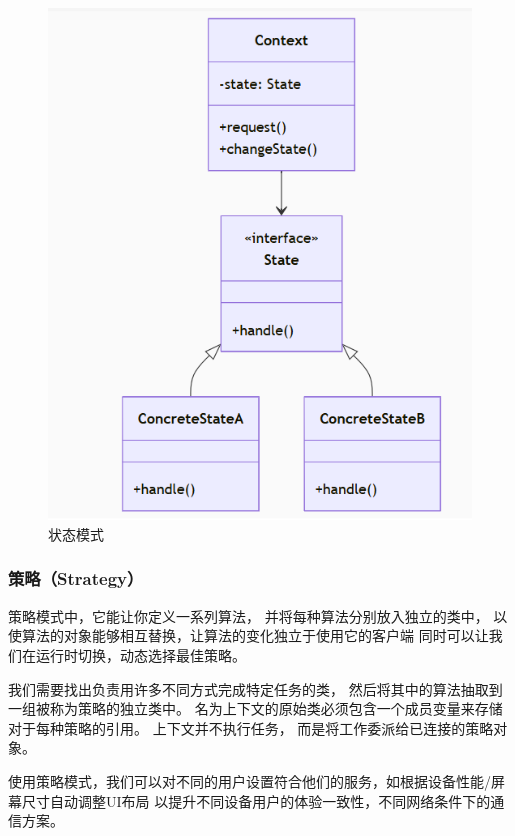 \documentclass[12pt]{ctexart} %
\begin{document}
\begin{figure}[H]
  \centering
  \includegraphics[width=1\textwidth]{zhuangtai.png}
  \caption{状态模式}
\end{figure}

\subsubsection{策略（Strategy）} 
策略模式中，它能让你定义一系列算法， 
并将每种算法分别放入独立的类中， 以使算法的对象能够相互替换，让算法的变化独立于使用它的客户端
同时可以让我们在运行时切换，动态选择最佳策略。

我们需要找出负责用许多不同方式完成特定任务的类， 然后将其中的算法抽取到一组被称为策略的独立类中。
名为上下文的原始类必须包含一个成员变量来存储对于每种策略的引用。 上下文并不执行任务， 
而是将工作委派给已连接的策略对象。

使用策略模式，我们可以对不同的用户设置符合他们的服务，如根据设备性能/屏幕尺寸自动调整UI布局
以提升不同设备用户的体验一致性，不同网络条件下的通信方案。
\end{document}
